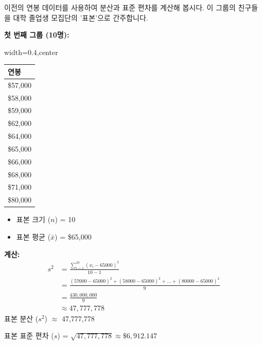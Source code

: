 \documentclass[11pt,a4paper]{article}
\theoremstyle{definition}
\begin{document}
\begin{examplebox}[title=예시: 연봉 데이터로 분산 및 표준 편차 계산]
이전의 연봉 데이터를 사용하여 분산과 표준 편차를 계산해 봅시다. 이 그룹의 친구들을 대학 졸업생 모집단의 '표본'으로 간주합니다.

\textbf{첫 번째 그룹 (10명):}
\begin{adjustbox}{width=0.4\textwidth,center}
\begin{tabular}{l}
\toprule
\textbf{연봉} \\
\midrule
\$57,000 \\
\$58,000 \\
\$59,000 \\
\$62,000 \\
\$64,000 \\
\$65,000 \\
\$66,000 \\
\$68,000 \\
\$71,000 \\
\$80,000 \\
\bottomrule
\end{tabular}
\end{adjustbox}
\label{tab:salary_example1_sd}
\begin{itemize}
    \item 표본 크기 ($n$) = 10
    \item 표본 평균 ($\bar{x}$) = \$65,000
\end{itemize}
\textbf{계산:}
\begin{align*}
    s^2 &= \frac{\sum_{i=1}^{10} (x_i - 65000)^2}{10-1} \\
    &= \frac{(57000-65000)^2 + (58000-65000)^2 + \dots + (80000-65000)^2}{9} \\
    &= \frac{430,000,000}{9} \\
    &\approx 47,777,778
\end{align*}
표본 분산 ($s^2$) $\approx$ 47,777,778

표본 표준 편차 ($s$) = $\sqrt{47,777,778} \approx \$6,912.147$


\end{examplebox}
\end{document}
